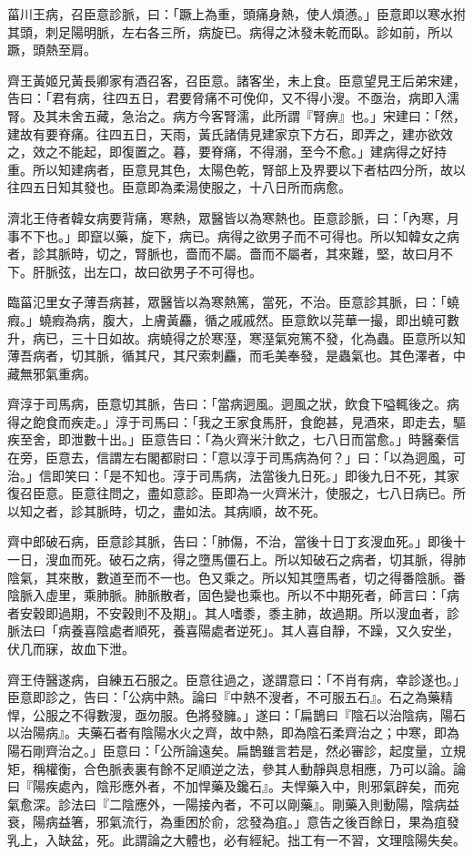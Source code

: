 \begin{pinyinscope}
菑川王病，召臣意診脈，曰：「蹶上為重，頭痛身熱，使人煩懣。」臣意即以寒水拊其頭，刺足陽明脈，左右各三所，病旋已。病得之沐發未乾而臥。診如前，所以蹶，頭熱至肩。

齊王黃姬兄黃長卿家有酒召客，召臣意。諸客坐，未上食。臣意望見王后弟宋建，告曰：「君有病，往四五日，君要脅痛不可俛仰，又不得小溲。不亟治，病即入濡腎。及其未舍五藏，急治之。病方今客腎濡，此所謂『腎痹』也。」宋建曰：「然，建故有要脊痛。往四五日，天雨，黃氏諸倩見建家京下方石，即弄之，建亦欲效之，效之不能起，即復置之。暮，要脊痛，不得溺，至今不愈。」建病得之好持重。所以知建病者，臣意見其色，太陽色乾，腎部上及界要以下者枯四分所，故以往四五日知其發也。臣意即為柔湯使服之，十八日所而病愈。

濟北王侍者韓女病要背痛，寒熱，眾醫皆以為寒熱也。臣意診脈，曰：「內寒，月事不下也。」即竄以藥，旋下，病已。病得之欲男子而不可得也。所以知韓女之病者，診其脈時，切之，腎脈也，嗇而不屬。嗇而不屬者，其來難，堅，故曰月不下。肝脈弦，出左口，故曰欲男子不可得也。

臨菑氾里女子薄吾病甚，眾醫皆以為寒熱篤，當死，不治。臣意診其脈，曰：「蟯瘕。」蟯瘕為病，腹大，上膚黃麤，循之戚戚然。臣意飲以芫華一撮，即出蟯可數升，病已，三十日如故。病蟯得之於寒溼，寒溼氣宛篤不發，化為蟲。臣意所以知薄吾病者，切其脈，循其尺，其尺索刺麤，而毛美奉發，是蟲氣也。其色澤者，中藏無邪氣重病。

齊淳于司馬病，臣意切其脈，告曰：「當病迵風。迵風之狀，飲食下嗌輒後之。病得之飽食而疾走。」淳于司馬曰：「我之王家食馬肝，食飽甚，見酒來，即走去，驅疾至舍，即泄數十出。」臣意告曰：「為火齊米汁飲之，七八日而當愈。」時醫秦信在旁，臣意去，信謂左右閣都尉曰：「意以淳于司馬病為何？」曰：「以為迵風，可治。」信即笑曰：「是不知也。淳于司馬病，法當後九日死。」即後九日不死，其家復召臣意。臣意往問之，盡如意診。臣即為一火齊米汁，使服之，七八日病已。所以知之者，診其脈時，切之，盡如法。其病順，故不死。

齊中郎破石病，臣意診其脈，告曰：「肺傷，不治，當後十日丁亥溲血死。」即後十一日，溲血而死。破石之病，得之墮馬僵石上。所以知破石之病者，切其脈，得肺陰氣，其來散，數道至而不一也。色又乘之。所以知其墮馬者，切之得番陰脈。番陰脈入虛里，乘肺脈。肺脈散者，固色變也乘也。所以不中期死者，師言曰：「病者安穀即過期，不安穀則不及期」。其人嗜黍，黍主肺，故過期。所以溲血者，診脈法曰「病養喜陰處者順死，養喜陽處者逆死」。其人喜自靜，不躁，又久安坐，伏几而寐，故血下泄。

齊王侍醫遂病，自練五石服之。臣意往過之，遂謂意曰：「不肖有病，幸診遂也。」臣意即診之，告曰：「公病中熱。論曰『中熱不溲者，不可服五石』。石之為藥精悍，公服之不得數溲，亟勿服。色將發臃。」遂曰：「扁鵲曰『陰石以治陰病，陽石以治陽病』。夫藥石者有陰陽水火之齊，故中熱，即為陰石柔齊治之；中寒，即為陽石剛齊治之。」臣意曰：「公所論遠矣。扁鵲雖言若是，然必審診，起度量，立規矩，稱權衡，合色脈表裏有餘不足順逆之法，參其人動靜與息相應，乃可以論。論曰『陽疾處內，陰形應外者，不加悍藥及鑱石』。夫悍藥入中，則邪氣辟矣，而宛氣愈深。診法曰『二陰應外，一陽接內者，不可以剛藥』。剛藥入則動陽，陰病益衰，陽病益箸，邪氣流行，為重困於俞，忿發為疽。」意告之後百餘日，果為疽發乳上，入缺盆，死。此謂論之大體也，必有經紀。拙工有一不習，文理陰陽失矣。


\end{pinyinscope}
